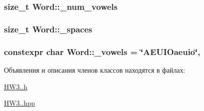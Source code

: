 \subsubsection[{\texorpdfstring{\+\_\+num\+\_\+vowels}{_num_vowels}}]{\setlength{\rightskip}{0pt plus 5cm}size\+\_\+t Word\+::\+\_\+num\+\_\+vowels\hspace{0.3cm}{\ttfamily [protected]}}\hypertarget{classWord_a95a4914370c936b524ab21ff42177fb8}{}\label{classWord_a95a4914370c936b524ab21ff42177fb8}
\subsubsection[{\texorpdfstring{\+\_\+spaces}{_spaces}}]{\setlength{\rightskip}{0pt plus 5cm}size\+\_\+t Word\+::\+\_\+spaces\hspace{0.3cm}{\ttfamily [protected]}}\hypertarget{classWord_afffea82d937c3486011b409bcff4c938}{}\label{classWord_afffea82d937c3486011b409bcff4c938}
\subsubsection[{\texorpdfstring{\+\_\+vowels}{_vowels}}]{\setlength{\rightskip}{0pt plus 5cm}constexpr char Word\+::\+\_\+vowels = \char`\"{}A\+E\+U\+I\+Oaeuio\char`\"{}\hspace{0.3cm}{\ttfamily [static]}, {\ttfamily [protected]}}\hypertarget{classWord_a5c77b083065c497224d3ad4b0b5958de}{}\label{classWord_a5c77b083065c497224d3ad4b0b5958de}


Объявления и описания членов классов находятся в файлах\+:\begin{DoxyCompactItemize}
\item 
\hyperlink{HW3_81_8h}{H\+W3..\+h}\item 
\hyperlink{HW3_81_8hpp}{H\+W3..\+hpp}\end{DoxyCompactItemize}
